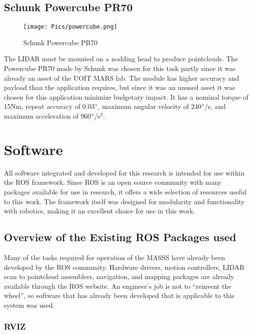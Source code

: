 \subsection{Schunk Powercube PR70}
\begin{figure}[H]
    \centering
    \texttt{[image: Pics/powercube.png]}
    \caption{Schunk Powercube PR70 \cite{schunkpage}}
    \label{fig:schunk}
\end{figure}
The LIDAR must be mounted on a nodding head to produce pointclouds. The Powercube PR70 made by Schunk was chosen for this task partly since it was already an asset of the UOIT MARS lab. The module has higher accuracy and payload than the application requires, but since it was an unused asset it was chosen for this application minimize budgetary impact. It has a nominal torque of 15Nm, repeat accuracy of 0.03$\degree$, maximum angular velocity of 240$\degree$/s, and maximum acceleration of 960$\degree$/s$^2$. \\
\section{Software}
\label{sec:software}
All software integrated and developed for this research is intended for use within the ROS framework. Since ROS is an open source community with many packages available for use in research, it offers a wide selection of resources useful to this work. The framework itself was designed for modularity and functionality with robotics, making it an excellent choice for use in this work.\\
\subsection{Overview of the Existing ROS Packages used}

Many of the tasks required for operation of the MASSS have already been developed by the ROS community. Hardware drivers, motion controllers, LIDAR scan to pointcloud assemblers, navigation, and mapping packages are already available through the ROS website. An engineer's job is not to ``reinvent the wheel'', so software that has already been developed that is applicable to this system was used.\\
\subsubsection{RVIZ}
\label{sec:rviz}

